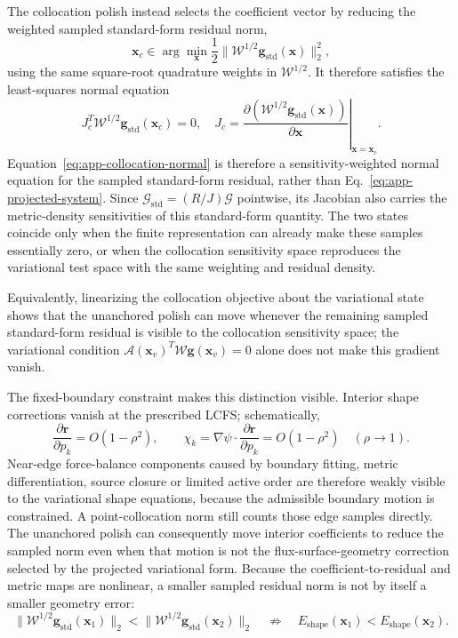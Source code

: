 \documentclass[final, 3p, times]{elsarticle}
\begin{document}
The collocation polish instead selects the coefficient vector by reducing the weighted sampled standard-form residual norm,
\begin{equation*}
    \mathbf{x}_{c}\in\arg\min_{\mathbf{x}}
    \frac{1}{2}\|\mathcal{W}^{1/2}\mathbf{g}_{\mathrm{std}}(\mathbf{x})\|_2^2,
\end{equation*}
using the same square-root quadrature weights in $\mathcal{W}^{1/2}$. It therefore satisfies the least-squares normal equation
\begin{equation}
    J_c^{T}\mathcal{W}^{1/2}\mathbf{g}_{\mathrm{std}}(\mathbf{x}_{c})=0, \quad
    J_c=
    \left.        \frac{\partial\!\left(\mathcal{W}^{1/2}\mathbf{g}_{\mathrm{std}}(\mathbf{x})\right)}
    {\partial\mathbf{x}}
    \right|_{\mathbf{x}=\mathbf{x}_c}.
    \label{eq:app-collocation-normal}
\end{equation}
Equation~\eqref{eq:app-collocation-normal} is therefore a sensitivity-weighted normal equation for the sampled standard-form residual, rather than Eq.~\eqref{eq:app-projected-system}. Since $\mathcal{G}_{\mathrm{std}}=(R/J)\mathcal{G}$ pointwise, its Jacobian also carries the metric-density sensitivities of this standard-form quantity. The two states coincide only when the finite representation can already make these samples essentially zero, or when the collocation sensitivity space reproduces the variational test space with the same weighting and residual density.

Equivalently, linearizing the collocation objective about the variational state shows that the unanchored polish can move whenever the remaining sampled standard-form residual is visible to the collocation sensitivity space; the variational condition $\mathcal{A}(\mathbf{x}_{v})^{T}\mathcal{W}\mathbf{g}(\mathbf{x}_{v})=0$ alone does not make this gradient vanish.

The fixed-boundary constraint makes this distinction visible. Interior shape corrections vanish at the prescribed LCFS; schematically,
\begin{equation*}
    \frac{\partial\mathbf{r}}{\partial p_k}=O(1-\rho^2),
    \qquad
    \chi_k=\nabla\psi\cdot\frac{\partial\mathbf{r}}{\partial p_k}=O(1-\rho^2)
    \quad (\rho\to1) .
\end{equation*}
Near-edge force-balance components caused by boundary fitting, metric differentiation, source closure or limited active order are therefore weakly visible to the variational shape equations, because the admissible boundary motion is constrained. A point-collocation norm still counts those edge samples directly. The unanchored polish can consequently move interior coefficients to reduce the sampled norm even when that motion is not the flux-surface-geometry correction selected by the projected variational form. Because the coefficient-to-residual and metric maps are nonlinear, a smaller sampled residual norm is not by itself a smaller geometry error:
\begin{equation*}
    \|\mathcal{W}^{1/2}\mathbf{g}_{\mathrm{std}}(\mathbf{x}_1)\|_2
    <
    \|\mathcal{W}^{1/2}\mathbf{g}_{\mathrm{std}}(\mathbf{x}_2)\|_2
    \quad\not\Rightarrow\quad
    E_{\mathrm{shape}}(\mathbf{x}_1)<E_{\mathrm{shape}}(\mathbf{x}_2).
\end{equation*}
\end{document}
